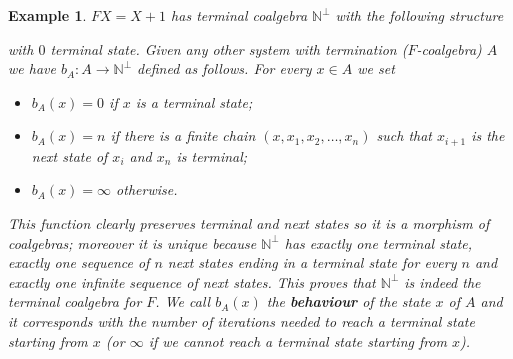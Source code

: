 \documentclass[letterpaper, 11pt, oneside]{memoir}
\theoremstyle{myteo}
\newtheorem{example}[theorem]{Example}
\numberwithin{equation}{section}
\begin{document}
\begin{example}
  \label{ex:terminalcoalgebra1}
  \(FX = X + 1\) has terminal coalgebra \(\mathbb{N}^\bot\) with the following structure
  \begin{center}
  \end{center}
  with \(0\) terminal state.
  Given any other system with termination (\(F\)-coalgebra) \(A\) we have \(b_A : A \to \mathbb{N}^\bot\) defined as follows.
  For every \(x \in A\) we set
  \begin{itemize}
  \item[1.] \(b_A(x) = 0\) if \(x\) is a terminal state;
  \item[2.] \(b_A(x) = n\) if there is a finite chain \((x, x_1, x_2, \ldots, x_n)\) such that \(x_{i+1}\) is the next state of \(x_i\) and \(x_n\) is terminal;
  \item[3.] \(b_A(x) = \infty\) otherwise.
  \end{itemize}
  This function clearly preserves terminal and next states so it is a morphism of coalgebras; moreover it is unique because \(\mathbb{N}^\bot\) has exactly one terminal state, exactly one sequence of \(n\) next states ending in a terminal state for every \(n\) and exactly one infinite sequence of next states.
  This proves that \(\mathbb{N}^\bot\) is indeed the terminal coalgebra for \(F\).
  We call \(b_A(x)\) the \textbf{behaviour} of the state \(x\) of \(A\) and it corresponds with the number of iterations needed to reach a terminal state starting from \(x\) (or \(\infty\) if we cannot reach a terminal state starting from \(x\)).
\end{example}
\end{document}
